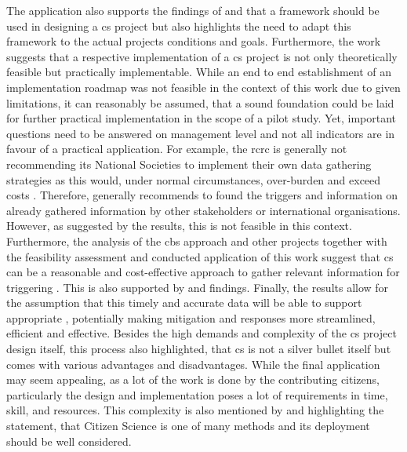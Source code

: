 The application also supports the findings of \textcite{garciaFindingWhatYou2021} and \textcite{conradCommunityBasedMonitoringFrameworks2008} that a framework should be used in designing a \acrshort{cs} project but also highlights the need to adapt this framework to the actual projects conditions and goals. Furthermore, the work suggests that a respective implementation of a \acrlong{cs} project is not only theoretically feasible but practically implementable. While an end to end establishment of an implementation roadmap was not feasible in the context of this work due to given limitations, it can reasonably be assumed, that a sound foundation could be laid for further practical implementation in the scope of a pilot study. Yet, important questions need to be answered on management level and not all indicators are in favour of a practical application. For example, the \acrshort{rcrc} is generally not recommending its National Societies to implement their own data gathering strategies as this would, under normal circumstances, over-burden and exceed costs \autocite{rcrcForecastbasedFinancingEarly2020}. Therefore, \textcite{rcrcForecastbasedFinancingEarly2020} generally recommends to found the triggers and information on already gathered information by other stakeholders or international organisations. However, as suggested by the results, this is not feasible in this context. Furthermore, the analysis of the \acrshort{cbs} approach and other projects together with the feasibility assessment and conducted application of this work suggest that \acrshort{cs} can be a reasonable and cost-effective approach to gather relevant information for triggering . This is also supported by \textcite{aceves-buenoCitizenScienceApproach2015} and \textcite{minkmanCitizenScienceWater2015} findings. 
Finally, the results allow for the assumption that this timely and accurate data will be able to support appropriate , potentially making mitigation and responses more streamlined, efficient and effective.\newline
Besides the high demands and complexity of the \acrshort{cs} project design itself, this process also highlighted, that \acrshort{cs} is not a silver bullet itself but comes with various advantages and disadvantages. While the final application may seem appealing, as a lot of the work is done by the contributing citizens, particularly the design and implementation poses a lot of requirements in time, skill, and resources. This complexity is also mentioned by \textcite{fraislCitizenScienceEnvironmental2022} and \textcite{minkmanCitizenScienceWater2015} highlighting the statement, that Citizen Science is one of many methods and its deployment should be well considered.


